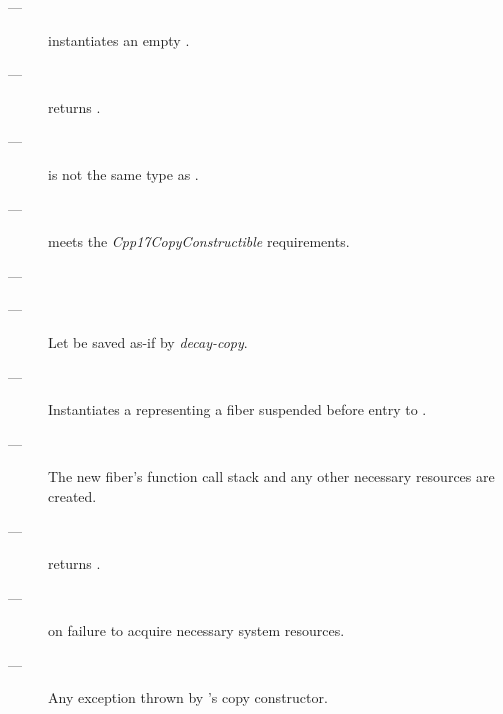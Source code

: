 \effects
\begin{description}
    \item[---] instantiates an empty \fiber.
\end{description}

\postcond
\begin{description}
    \item[---] \emptyfn returns \true.
\end{description}


\constraints
\begin{description}
    \item[---]  is not the same type as \fiber.
\end{description}

\mandates
\begin{description}
    \item[---]  meets the \emph{Cpp17CopyConstructible} requirements.
    \item[---] 
\end{description}

\effects
\begin{description}
    \item[---] Let  be saved as-if by \emph{decay-copy}.
    \item[---] Instantiates a \fiber representing a fiber suspended before
              entry to .
    \item[---] The new fiber's function call stack and any other necessary
              resources are created.
\end{description}

\postcond
\begin{description}
    \item[---] \emptyfn returns \false.
\end{description}

\except
\begin{description}
    \item[---]  on failure to acquire necessary system
               resources.
    \item[---] Any exception thrown by 's copy constructor.
\end{description}

